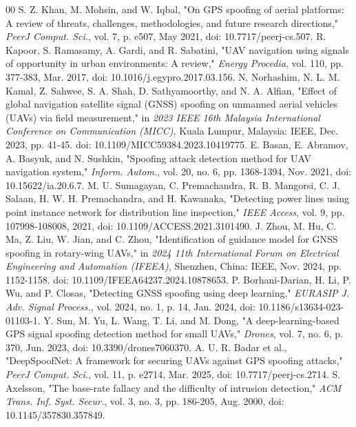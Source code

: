\documentclass{ieeeaccess}
\begin{document}
\begin{thebibliography}{00}
 S. Z. Khan, M. Mohsin, and W. Iqbal, "On GPS spoofing of aerial platforms: A review of threats, challenges, methodologies, and future research directions," \textit{PeerJ Comput. Sci.}, vol. 7, p. e507, May 2021, doi: 10.7717/peerj-cs.507.
 R. Kapoor, S. Ramasamy, A. Gardi, and R. Sabatini, "UAV navigation using signals of opportunity in urban environments: A review," \textit{Energy Procedia}, vol. 110, pp. 377-383, Mar. 2017, doi: 10.1016/j.egypro.2017.03.156.
 N. Norhashim, N. L. M. Kamal, Z. Sahwee, S. A. Shah, D. Sathyamoorthy, and N. A. Alfian, "Effect of global navigation satellite signal (GNSS) spoofing on unmanned aerial vehicles (UAVs) via field measurement," in \textit{2023 IEEE 16th Malaysia International Conference on Communication (MICC)}, Kuala Lumpur, Malaysia: IEEE, Dec. 2023, pp. 41-45. doi: 10.1109/MICC59384.2023.10419775.
 E. Basan, E. Abramov, A. Basyuk, and N. Sushkin, "Spoofing attack detection method for UAV navigation system," \textit{Inform. Autom.}, vol. 20, no. 6, pp. 1368-1394, Nov. 2021, doi: 10.15622/ia.20.6.7.
 M. U. Sumagayan, C. Premachandra, R. B. Mangorsi, C. J. Salaan, H. W. H. Premachandra, and H. Kawanaka, "Detecting power lines using point instance network for distribution line inspection," \textit{IEEE Access}, vol. 9, pp. 107998-108008, 2021, doi: 10.1109/ACCESS.2021.3101490.
 J. Zhou, M. Hu, C. Ma, Z. Liu, W. Jian, and C. Zhou, "Identification of guidance model for GNSS spoofing in rotary-wing UAVs," in \textit{2024 11th International Forum on Electrical Engineering and Automation (IFEEA)}, Shenzhen, China: IEEE, Nov. 2024, pp. 1152-1158. doi: 10.1109/IFEEA64237.2024.10878653.
 P. Borhani-Darian, H. Li, P. Wu, and P. Closas, "Detecting GNSS spoofing using deep learning," \textit{EURASIP J. Adv. Signal Process.}, vol. 2024, no. 1, p. 14, Jan. 2024, doi: 10.1186/s13634-023-01103-1.
 Y. Sun, M. Yu, L. Wang, T. Li, and M. Dong, "A deep-learning-based GPS signal spoofing detection method for small UAVs," \textit{Drones}, vol. 7, no. 6, p. 370, Jun. 2023, doi: 10.3390/drones7060370.
 A. U. R. Badar et al., "DeepSpoofNet: A framework for securing UAVs against GPS spoofing attacks," \textit{PeerJ Comput. Sci.}, vol. 11, p. e2714, Mar. 2025, doi: 10.7717/peerj-cs.2714.
 S. Axelsson, "The base-rate fallacy and the difficulty of intrusion detection," \textit{ACM Trans. Inf. Syst. Secur.}, vol. 3, no. 3, pp. 186-205, Aug. 2000, doi: 10.1145/357830.357849.

\end{thebibliography}
\end{document}
